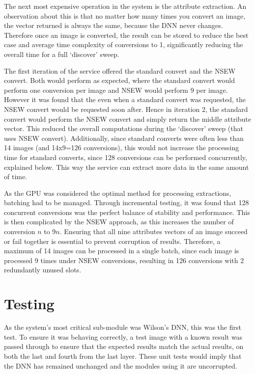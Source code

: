 The next most expensive operation in the system is the attribute extraction. An observation about this is that no matter how many times you convert an image, the vector returned is always the same, because the DNN  never changes. Therefore once an image is converted, the result can be stored to reduce the best case and average time complexity of conversions to 1, significantly reducing the overall time for a full ‘discover’ sweep.

The first iteration of the service offered the standard convert and the NSEW convert. Both would perform as expected, where the standard convert would perform one conversion per image and NSEW would perform 9 per image. However it was found that the even when a standard convert was requested, the NSEW convert would be requested soon after. Hence in iteration 2, the standard convert would perform the NSEW convert and simply return the middle attribute vector. This reduced the overall computations during the ‘discover’ sweep (that uses NSEW convert). Additionally, since standard converts were often less than 14 images (and 14x9=126 conversions), this would not increase the processing time for standard converts, since 128 conversions can be performed concurrently, explained below. This way the service can extract more data in the same amount of time. 

As the GPU was considered the optimal method for processing extractions, batching had to be managed. Through incremental testing, it was found that 128 concurrent conversions was the perfect balance of stability and performance. This is then complicated by the NSEW approach, as this increases the number of conversion $n$ to $9n$. Ensuring that all nine attributes vectors of an image succeed or fail together is essential to prevent corruption of results. Therefore, a maximum of 14 images can be processed in a single batch, since each image is processed 9 times under NSEW conversions, resulting in 126 conversions with 2 redundantly unused slots.

\section{Testing}
As the system’s most critical sub-module was Wilson’s DNN, this was the first test. To ensure it was behaving correctly, a test image with a known result was passed through to ensure that the expected results match the actual results, on both the last and fourth from the last layer. These unit tests would imply that the DNN has remained unchanged and the modules using it are uncorrupted.

